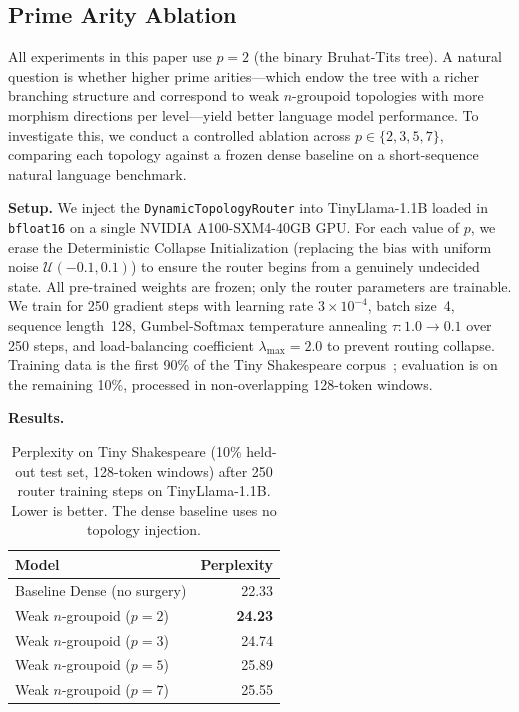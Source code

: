 \documentclass[11pt,a4paper]{article}
\begin{document}
\subsection{Prime Arity Ablation}
\label{sec:prime_arity}

All experiments in this paper use $p = 2$ (the binary Bruhat-Tits tree). A natural question is whether higher prime arities---which endow the tree with a richer branching structure and correspond to weak $n$-groupoid topologies with more morphism directions per level---yield better language model performance. To investigate this, we conduct a controlled ablation across $p \in \{2, 3, 5, 7\}$, comparing each topology against a frozen dense baseline on a short-sequence natural language benchmark.

\textbf{Setup.} We inject the \texttt{DynamicTopologyRouter} into TinyLlama-1.1B loaded in \texttt{bfloat16} on a single NVIDIA A100-SXM4-40GB GPU. For each value of $p$, we erase the Deterministic Collapse Initialization (replacing the bias with uniform noise $\mathcal{U}(-0.1, 0.1)$) to ensure the router begins from a genuinely undecided state. All pre-trained weights are frozen; only the router parameters are trainable. We train for 250 gradient steps with learning rate $3 \times 10^{-4}$, batch size~4, sequence length~128, Gumbel-Softmax temperature annealing $\tau: 1.0 \to 0.1$ over 250 steps, and load-balancing coefficient $\lambda_{\max} = 2.0$ to prevent routing collapse. Training data is the first 90\% of the Tiny Shakespeare corpus~\citep{karpathy2015char}; evaluation is on the remaining 10\%, processed in non-overlapping 128-token windows.

\textbf{Results.}

\begin{table}[h]
\centering
\caption{Perplexity on Tiny Shakespeare (10\% held-out test set, 128-token windows) after 250 router training steps on TinyLlama-1.1B. Lower is better. The dense baseline uses no topology injection.}
\label{tab:prime_arity}
\begin{tabular}{@{}lr@{}}
\toprule
Model & Perplexity \\
\midrule
Baseline Dense (no surgery) & 22.33 \\
Weak $n$-groupoid ($p=2$)   & \textbf{24.23} \\
Weak $n$-groupoid ($p=3$)   & 24.74 \\
Weak $n$-groupoid ($p=5$)   & 25.89 \\
Weak $n$-groupoid ($p=7$)   & 25.55 \\
\bottomrule
\end{tabular}
\end{table}
\end{document}
